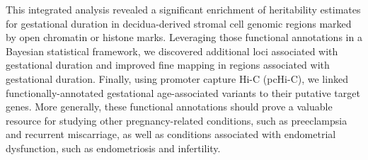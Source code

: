 This integrated analysis revealed a significant enrichment of heritability estimates for gestational duration in decidua-derived stromal cell genomic regions marked by open chromatin or histone marks. Leveraging those functional annotations in a Bayesian statistical framework, we discovered additional loci associated with gestational duration and improved fine mapping in regions associated with gestational duration. Finally, using promoter capture Hi-C (pcHi-C), we linked functionally-annotated gestational age-associated variants to their putative target genes. More generally, these functional annotations should prove a valuable resource for studying other pregnancy-related conditions, such as preeclampsia and recurrent miscarriage, as well as conditions associated with endometrial dysfunction, such as endometriosis and infertility.